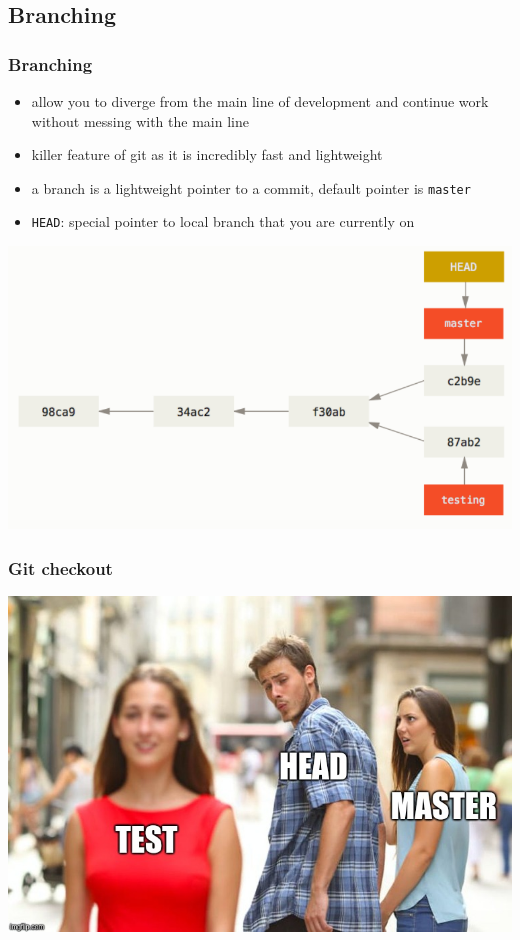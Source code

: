 \documentclass[12pt]{beamer}
\begin{document}
\subsection{Branching}
\begin{frame}
\frametitle{Branching}
\begin{itemize}
	\item allow you to diverge from the main line of development and continue work without messing with the main line	
	\item killer feature of git as it is incredibly fast and lightweight
	\item a branch is a lightweight pointer to a commit, default pointer is \texttt{master}
	\item \texttt{HEAD}: special pointer to local branch that you are currently on
\end{itemize}
\begin{center}
	\includegraphics[width=0.6\linewidth]{branching}
\end{center}
\end{frame}


\begin{frame}
\frametitle{Git checkout}
\begin{center}
	\includegraphics[width=0.6\linewidth]{checkout_meme}
\end{center}
\end{frame}
\end{document}
